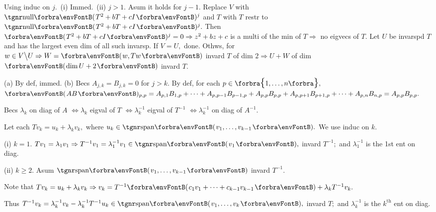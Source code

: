 Using induc on $j.$ \,(i) Immed. \,(ii) $j>1.$ Asum it holds for $j-1.$\parSol{}
Replace $V$ with $\Null\Par{T^2+bT+cI}{^{j}}$ and $T$ with $T$ restr to $\Null\Par{T^2+bT+cI}{^{j}}.$\parSol{}
Then $\Par{T^2+bT+cI}{^{j}}=0\Rightarrow z^2+bz+c$ is a multi of the min of $T\Rightarrow$ no eigvecs of $T.$\parSol{}
Let $U$ be invarspd $T$ and has the largest even dim of all such invarsp. If $V=U,$ done. Othws,\parSol{}
for $w\in V\Backslash U\Rightarrow W=\Par{w,Tw}$ invard $T$ of dim $2\Rightarrow U+W$ of dim $\Par{{\dim U+2}}$ invard $T.$\PfEnd
\SepLine
\pagebreak


\vspace{4pt}

(a) By def, immed. \:(b) Becs $A_{j,k}=B_{j,k}=0$ for $j>k.$ By def, for each $p\in\Bra{1,\dots,n},$\parSol{} $\Par{AB}{_{p,p}}=A_{p,1}B_{1,p}+\dots+A_{p,p-1}B_{p-1,p}+A_{p,p}B_{p,p}+A_{p,p+1}B_{p+1,p}+\dots+A_{p,n}B_{n,p}=A_{p,p}B_{p,p}.$\PfEnd
\SepLine

Becs $\lambda_k$ on diag of $A$ $\Longleftrightarrow\lambda_k$ eigval of $T$ $\Longleftrightarrow\lambda_k^{-1}$ eigval of $T^{-1}$ $\Longleftrightarrow\lambda_k^{-1}$ on diag of $A^{-1}.$\PfEnd\vspace{2pt}\par\quad
\Or Let each $Tv_k=u_k+\lambda_kv_k,$ where $u_k\in\Span{v_1,\dots,v_{k-1}}.$ We use induc on $k.$\par\quad
(i) $k=1.$ $Tv_1=\lambda_1v_1\Rightarrow T^{-1}v_1=\lambda_1^{-1}v_1\in\Span{v_1},$ invard $T^{-1};$ and $\lambda_1^{-1}$ is the 1st ent on diag.\par\quad\Endi
(ii) $k\geqslant 2.$ Asum $\Span{v_1,\dots,v_{k-1}}$ invard $T^{-1}.$\par\quad\Hii
Note that $Tv_k=u_k+\lambda_kv_k\Rightarrow v_k=T^{-1}\Par{c_1v_1+\dots+c_{k-1}v_{k-1}}+\lambda_kT^{-1}v_k.$\par\quad\Hii
Thus $T^{-1}v_k=\lambda_k^{-1}v_k-\lambda_k^{-1}T^{-1}u_k\in\Span{v_1,\dots,v_k},$ invard $T;$ and $\lambda_{k}^{-1}$ is the $k^\text{th}$ ent on diag.\PfEnd
\SepLine

